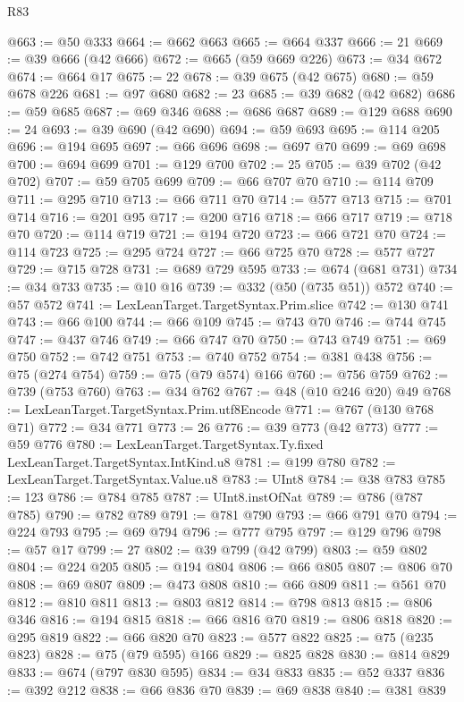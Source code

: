 \begin{lexlean}{R83}
\begin{coremodule}
@663 := @50 @333
@664 := @662 @663
@665 := @664 @337
@666 := 21
@669 := @39 @666 (@42 @666)
@672 := @665 (@59 @669 @226)
@673 := @34 @672
@674 := @664 @17
@675 := 22
@678 := @39 @675 (@42 @675)
@680 := @59 @678 @226
@681 := @97 @680
@682 := 23
@685 := @39 @682 (@42 @682)
@686 := @59 @685
@687 := @69 @346
@688 := @686 @687
@689 := @129 @688
@690 := 24
@693 := @39 @690 (@42 @690)
@694 := @59 @693
@695 := @114 @205
@696 := @194 @695
@697 := @66 @696
@698 := @697 @70
@699 := @69 @698
@700 := @694 @699
@701 := @129 @700
@702 := 25
@705 := @39 @702 (@42 @702)
@707 := @59 @705 @699
@709 := @66 @707 @70
@710 := @114 @709
@711 := @295 @710
@713 := @66 @711 @70
@714 := @577 @713
@715 := @701 @714
@716 := @201 @95
@717 := @200 @716
@718 := @66 @717
@719 := @718 @70
@720 := @114 @719
@721 := @194 @720
@723 := @66 @721 @70
@724 := @114 @723
@725 := @295 @724
@727 := @66 @725 @70
@728 := @577 @727
@729 := @715 @728
@731 := @689 @729 @595
@733 := @674 (@681 @731)
@734 := @34 @733
@735 := @10 @16
@739 := @332 (@50 (@735 @51)) @572
@740 := @57 @572
@741 := LexLeanTarget.TargetSyntax.Prim.slice
@742 := @130 @741
@743 := @66 @100
@744 := @66 @109
@745 := @743 @70
@746 := @744 @745
@747 := @437 @746
@749 := @66 @747 @70
@750 := @743 @749
@751 := @69 @750
@752 := @742 @751
@753 := @740 @752
@754 := @381 @438
@756 := @75 (@274 @754)
@759 := @75 (@79 @574) @166
@760 := @756 @759
@762 := @739 (@753 @760)
@763 := @34 @762
@767 := @48 (@10 @246 @20) @49
@768 := LexLeanTarget.TargetSyntax.Prim.utf8Encode
@771 := @767 (@130 @768 @71)
@772 := @34 @771
@773 := 26
@776 := @39 @773 (@42 @773)
@777 := @59 @776
@780 := LexLeanTarget.TargetSyntax.Ty.fixed LexLeanTarget.TargetSyntax.IntKind.u8
@781 := @199 @780
@782 := LexLeanTarget.TargetSyntax.Value.u8
@783 := UInt8
@784 := @38 @783
@785 := 123
@786 := @784 @785
@787 := UInt8.instOfNat
@789 := @786 (@787 @785)
@790 := @782 @789
@791 := @781 @790
@793 := @66 @791 @70
@794 := @224 @793
@795 := @69 @794
@796 := @777 @795
@797 := @129 @796
@798 := @57 @17
@799 := 27
@802 := @39 @799 (@42 @799)
@803 := @59 @802
@804 := @224 @205
@805 := @194 @804
@806 := @66 @805
@807 := @806 @70
@808 := @69 @807
@809 := @473 @808
@810 := @66 @809
@811 := @561 @70
@812 := @810 @811
@813 := @803 @812
@814 := @798 @813
@815 := @806 @346
@816 := @194 @815
@818 := @66 @816 @70
@819 := @806 @818
@820 := @295 @819
@822 := @66 @820 @70
@823 := @577 @822
@825 := @75 (@235 @823)
@828 := @75 (@79 @595) @166
@829 := @825 @828
@830 := @814 @829
@833 := @674 (@797 @830 @595)
@834 := @34 @833
@835 := @52 @337
@836 := @392 @212
@838 := @66 @836 @70
@839 := @69 @838
@840 := @381 @839

\end{coremodule}
\end{lexlean}
